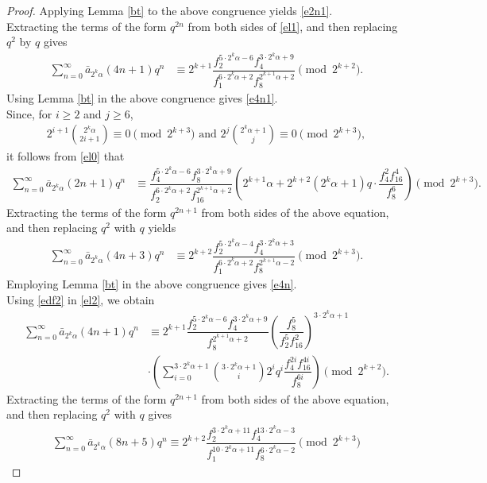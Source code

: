 \documentclass[11pt,a4paper]{article}
\numberwithin{equation}{section}
\theoremstyle{plain}
\begin{document}
\begin{proof}
	Applying Lemma \ref{bt} to the above congruence yields \eqref{e2n1}.\\
\indent	Extracting the terms of the form $q^{2n}$ from both sides of \eqref{el1}, and then replacing $q^{2}$ by $q$ gives
	\begin{align}\label{el2}
		\sum_{n=0}^{\infty}\bar{a}_{2^k\alpha}(4n+1)q^n&\equiv2^{k+1} \dfrac{f_2^{5\cdot2^k\alpha-6}f_4^{3\cdot2^k\alpha+9}}{f_1^{6\cdot2^{k}\alpha+2}f_{8}^{2^{k+1}\alpha+2}}\pmod {2^{k+2}}.
	\end{align}
	Using Lemma \ref{bt} in the above congruence gives \eqref{e4n1}.\\
	\indent	Since, for $i\ge2$ and $j\ge6$,
	\begin{align*}
		2^{i+1}\binom{2^k\alpha}{2i+1}\equiv 0\pmod{2^{k+3}} \text{ and } 2^j\binom{2^k\alpha+1}{j}\equiv 0\pmod{2^{k+3}},
	\end{align*}
	it follows from \eqref{el0} that
	\begin{align*}
		\sum_{n=0}^{\infty}\bar{a}_{2^k\alpha}(2n+1)q^n
		&\equiv \dfrac{f_4^{5\cdot2^k\alpha-6}f_8^{3\cdot2^k\alpha+9}}{f_2^{6\cdot2^{k}\alpha+2}f_{16}^{2^{k+1}\alpha+2}}\left(2^{k+1}\alpha+2^{k+2}(2^k\alpha+1)q\cdot \dfrac{f_4^2f_{16}^4}{f_8^6}\right)\pmod {2^{k+3}}.
	\end{align*}
	Extracting the terms of the form $q^{2n+1}$ from both sides of the above equation, and then replacing $q^{2}$ with $q$ yields
	\begin{align}\label{el3}
		\sum_{n=0}^{\infty}\bar{a}_{2^k\alpha}(4n+3)q^n&\equiv2^{k+2}\dfrac{f_2^{5\cdot2^k\alpha-4}f_4^{3\cdot2^k\alpha+3}}{f_1^{6\cdot2^{k}\alpha+2}f_{8}^{2^{k+1}\alpha-2}}\pmod{2^{k+3}}.
	\end{align}
	Employing Lemma \ref{bt} in the above congruence gives \eqref{e4n}.\\
	\indent Using \eqref{edf2} in \eqref{el2}, we obtain
\begin{align*}
	\sum_{n=0}^{\infty}\bar{a}_{2^k\alpha}(4n+1)q^n&\equiv2^{k+1} \dfrac{f_2^{5\cdot2^k\alpha-6}f_4^{3\cdot2^k\alpha+9}}{f_{8}^{2^{k+1}\alpha+2}}\left(\dfrac{f_8^5}{f_2^5f_{16}^2}\right)^{3\cdot2^k\alpha+1}\\
	&\cdot\left(\sum_{i=0}^{3\cdot2^k\alpha+1}\binom{3\cdot 2^k \alpha+1}{i}2^{i}q^{i}\dfrac{f_4^{2i}f_{16}^{4i}}{f_8^{6i}}\right)\pmod {2^{k+2}}.
\end{align*}
	Extracting the terms of the form $q^{2n+1}$ from both sides of the above equation, and then replacing $q^{2}$ with $q$ gives
\begin{align*}
\sum_{n=0}^{\infty}\bar{a}_{2^k\alpha}(8n+5)q^n\equiv 2^{k+2}\dfrac{f_2^{3\cdot2^k\alpha+11}f_4^{13\cdot 2^k\alpha -3}}{f_1^{10\cdot2^k\alpha+11}f_8^{6\cdot 2^k\alpha-2}}\pmod{2^{k+3}}

\end{align*}
\end{proof}
\end{document}

